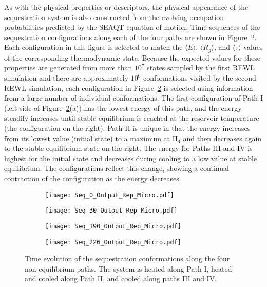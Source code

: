 \documentclass[
journal=jcisd8, %
manuscript=article,
layout=twocolumn   %
]{achemso}
\begin{document}
As with the physical properties or descriptors, the physical appearance of the sequestration system is also constructed from the evolving occupation probabilities predicted by the SEAQT equation of motion. Time sequences of the sequestration configurations along each of the four paths are shown in Figure~\ref{RepMicro_1}. Each  configuration in this figure is selected to match the $\langle E \rangle$, $\langle R_{g} \rangle$, and $\langle \tau \rangle$ values of the corresponding thermodynamic state.  Because the expected values for these properties are generated from more than $10^7$ states sampled by the first REWL simulation and there are approximately $10^6$ conformations visited by the second REWL simulation, each configuration in Figure~\ref{RepMicro_1} is selected using information from a large number of  individual conformations.  The first configuration of Path I (left side of Figure~\ref{RepMicro_1}(a)) has the lowest energy of this path, and the energy steadily increases until stable equilibrium is reached at the reservoir temperature (the configuration on the right).  Path II is unique in that the energy increases from its lowest value (initial state) to a maximum at II$_4$ and then decreases again to the stable equilibrium state on the right. The energy for Paths III and IV is highest for the initial state and decreases during cooling to a low value at stable equilibrium. The configurations reflect this change, showing a continual contraction of the configuration as the energy decreases.
\begin{figure}[ht!]
	\begin{center}
		\begin{subfigure}{0.45\textwidth}
			\texttt{[image: Seq\_0\_Output\_Rep\_Micro.pdf]}
			\caption{} \label{fig:conf-a}
			\texttt{[image: Seq\_30\_Output\_Rep\_Micro.pdf]}
			\caption{} \label{fig:conf-b}
			\texttt{[image: Seq\_190\_Output\_Rep\_Micro.pdf]}
			\caption{} \label{fig:conf-c}
			\texttt{[image: Seq\_226\_Output\_Rep\_Micro.pdf]}
			\caption{} \label{fig:conf-d}
		\end{subfigure}%
		\hspace*{\fill}
		\caption{Time evolution of the sequestration conformations along the four non-equilibrium paths. The system is heated along Path I, heated and cooled along Path II, and cooled along paths III and IV.}
		\label{RepMicro_1}
	\end{center}
\end{figure}
\end{document}
